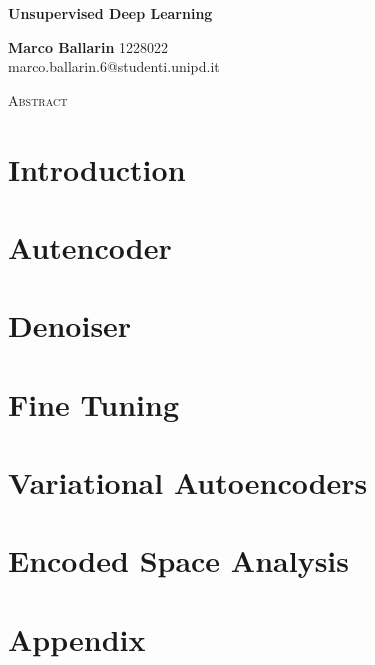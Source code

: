 \documentclass{article}
\begin{document}
\begin{center}
    \huge
    \textbf{Unsupervised Deep Learning}  %
    
    \normalsize
    \vspace{0.4cm}
    \textbf{Marco Ballarin} 1228022  \\ %
    marco.ballarin.6@studenti.unipd.it

    \vspace{0.5cm}
    \Large
    \textsc{ Abstract}
    \begin{adjustwidth}{30pt}{30pt}
    \normalsize
    \vspace{0.3cm}
    
    \end{adjustwidth}
\end{center}
\vspace{0.2cm}

\section{Introduction \label{sec:int}}


\section{Autencoder \label{sec:aut}}


\section{Denoiser \label{sec:den}}


\section{Fine Tuning \label{sec:ft}}


\section{Variational Autoencoders \label{sec:vae}}


\section{Encoded Space Analysis \label{sec:enc}}



\printbibliography


\newpage
\section{Appendix \label{sec:app}}


\end{document}
